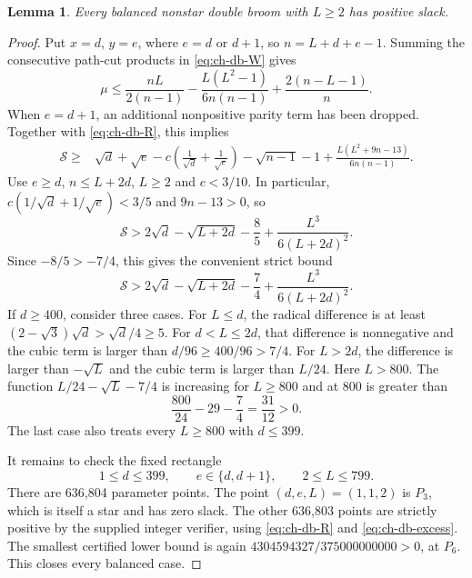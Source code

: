 \documentclass[11pt,a4paper]{article}
\newtheorem{lemma}[theorem]{Lemma}
\theoremstyle{remark}\newtheorem{remark}[theorem]{Remark}
\begin{document}
\begin{lemma}\label{lem:ch-balanced-double-brooms}
Every balanced nonstar double broom with $L\ge2$ has positive slack.
\end{lemma}
\begin{proof}
Put $x=d$, $y=e$, where $e=d$ or $d+1$, so $n=L+d+e-1$.
Summing the consecutive path-cut products in \eqref{eq:ch-db-W} gives
\[
 \mu\le\frac{nL}{2(n-1)}
       -\frac{L(L^2-1)}{6n(n-1)}+\frac{2(n-L-1)}n.
\]
When $e=d+1$, an additional nonpositive parity term has been dropped.
Together with \eqref{eq:ch-db-R}, this implies
\begin{align*}
 \mathcal S\ge{}&\sqrt d+\sqrt e
       -c\left(\frac1{\sqrt d}+\frac1{\sqrt e}\right)
       -\sqrt{n-1}-1
       +\frac{L(L^2+9n-13)}{6n(n-1)}.
\end{align*}
Use $e\ge d$, $n\le L+2d$, $L\ge2$ and $c<3/10$.
In particular,
$c(1/\sqrt d+1/\sqrt e)<3/5$ and $9n-13>0$, so
\[
 \mathcal S>
 2\sqrt d-\sqrt{L+2d}-\frac85+
                 \frac{L^3}{6(L+2d)^2}.
\]
Since $-8/5>-7/4$, this gives the convenient strict bound
\begin{equation}\label{eq:ch-db-coarse}
 \mathcal S>
 2\sqrt d-\sqrt{L+2d}-\frac74+
                 \frac{L^3}{6(L+2d)^2}.
\end{equation}
If $d\ge400$, consider three cases. For $L\le d$, the radical
difference is at least $(2-\sqrt3)\sqrt d>\sqrt d/4\ge5$.
For $d<L\le2d$, that difference is nonnegative and the cubic term is
larger than $d/96\ge400/96>7/4$. For $L>2d$, the difference is larger
than $-\sqrt L$ and the cubic term is larger than $L/24$. Here $L>800$.
The function $L/24-\sqrt L-7/4$ is increasing for $L\ge800$ and at 800
is greater than
\[
 \frac{800}{24}-29-\frac74=\frac{31}{12}>0.
\]
The last case also treats every $L\ge800$ with $d\le399$.

It remains to check the fixed rectangle
\[
 1\le d\le399,\qquad e\in\{d,d+1\},\qquad2\le L\le799.
\]
There are 636,804 parameter points. The point $(d,e,L)=(1,1,2)$ is
$P_3$, which is itself a star and has zero slack. The other 636,803
points are strictly positive by the supplied integer verifier, using
\eqref{eq:ch-db-R} and \eqref{eq:ch-db-excess}. The smallest certified
lower bound is again $4304594327/375000000000>0$, at $P_6$.
This closes every balanced case.
\end{proof}
\end{document}
